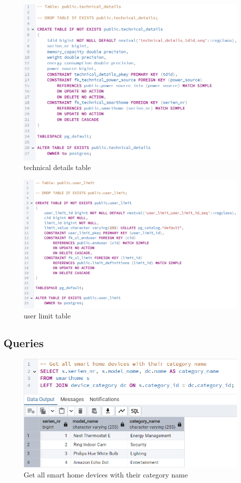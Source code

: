 \documentclass{article}
\begin{document}
\begin{figure}[H]
\centering
\includegraphics[width=\linewidth]{img/technical_details.png}
\caption{technical details table}
\end{figure}

\begin{figure}[H]
\centering
\includegraphics[width=\linewidth]{img/user_limit.png}
\caption{user limit table}
\end{figure}


\subsection{Queries}

\begin{figure}[H]
\centering
\includegraphics[width=\linewidth]{img/q1.png}
\caption{Get all smart home devices with their category name}
\end{figure}
\end{document}
